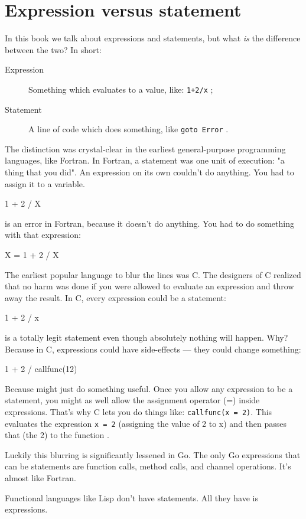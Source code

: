 \section{Expression versus statement}
\label{sec:expression versus statement}
In this book we talk about expressions and statements, but%
what \emph{is} the difference between the two?
In short:
\begin{description}
\item[Expression] Something which evaluates to a value, like:
\lstinline{1+2/x} ;
\item[Statement] A line of code which does something, like
\lstinline{goto Error} .
\end{description}

The distinction was crystal-clear in the earliest general-purpose
programming languages, like Fortran. In Fortran, a statement was one
unit of execution: "a thing that you did". 
An expression on its own couldn't do anything. You had to assign it to a
variable.
\begin{display}
1 + 2 / X
\end{display}
is an error in Fortran, because it doesn't do anything. You had to do
something with that expression: 
\begin{display}{X = 1 + 2 / X}\end{display}

The earliest popular language to blur the lines was C. The designers of
C realized that no harm was done if you were allowed to evaluate an
expression and throw away the result. In C, every expression could be a
statement: 
\begin{display}1 + 2 / x\end{display}
is a totally legit statement even though absolutely nothing will happen.
Why? Because in C, expressions could have side-effects --- they could
change something: \begin{display}{1 + 2 / callfunc(12)}\end{display}

Because  might just do something useful.
Once you allow any expression to be a statement, you might as well allow
the assignment operator (=) inside expressions. That's why C lets you do
things like: \lstinline{callfunc(x = 2)}.
This evaluates the expression \lstinline{x = 2} (assigning the value of 2 to x) and
then passes that (the 2) to the function .

Luckily this blurring is significantly lessened in Go.
The only Go
expressions that can be statements are function calls, method calls,
and channel operations. It's almost like Fortran. 

Functional languages like Lisp don't have statements.
All they have is expressions. 
